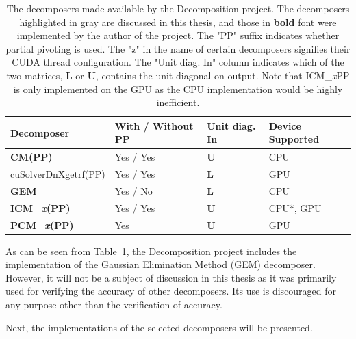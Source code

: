 \begin{table}[!ht]
	\centering
	\begin{tabular}{|l|l|l|l|}
		\hline
		Decomposer                                		     & With / Without PP & Unit diag. In & Device Supported \\ \hline
		\cellcolor[HTML]{EFEFEF}\textbf{CM(PP)}  		     & Yes / Yes         & $\mathbf{U}$  & CPU              \\
		\cellcolor[HTML]{EFEFEF}cuSolverDnXgetrf(PP)	     & Yes / Yes         & $\mathbf{L}$  & GPU              \\
		\textbf{GEM}                               		     & Yes / No          & $\mathbf{L}$  & CPU              \\
		\cellcolor[HTML]{EFEFEF}\textbf{ICM\_\textit{x}(PP)} & Yes / Yes         & $\mathbf{U}$  & CPU*, GPU        \\
		\cellcolor[HTML]{EFEFEF}\textbf{PCM\_\textit{x}(PP)} & Yes               & $\mathbf{U}$  & GPU              \\ \hline
	\end{tabular}
	\caption{The decomposers made available by the Decomposition project. The decomposers highlighted in gray are discussed in this thesis, and those in \textbf{bold} font were implemented by the author of the project. The "PP" suffix indicates whether partial pivoting is used. The "\textit{x}" in the name of certain decomposers signifies their CUDA thread configuration. The "Unit diag. In" column indicates which of the two matrices, $\mathbf{L}$ or $\mathbf{U}$, contains the unit diagonal on output. Note that ICM\_\textit{x}PP is only implemented on the GPU as the CPU implementation would be highly inefficient.}
	\label{Table:implementation->decomposition-project->implemented-solutions->decomposers->decomposers-in-the-project}
\end{table}

As can be seen from Table~\ref{Table:implementation->decomposition-project->implemented-solutions->decomposers->decomposers-in-the-project}, the Decomposition project includes the implementation of the Gaussian Elimination Method (GEM) decomposer. However, it will not be a subject of discussion in this thesis as it was primarily used for verifying the accuracy of other decomposers. Its use is discouraged for any purpose other than the verification of accuracy.

Next, the implementations of the selected decomposers will be presented.

